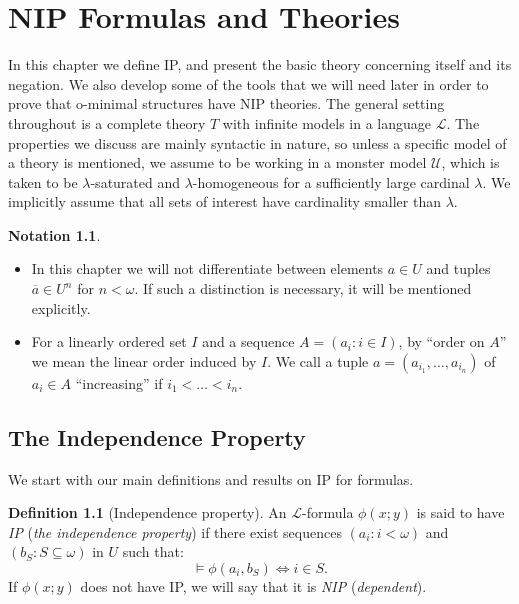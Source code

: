 \documentclass[a4paper]{report}
\newcommand{\ind}{\hspace{15pt}}
\renewcommand{\L}{\mathcal{L}}
\newcommand{\U}{\mathcal{U}}
\renewcommand{\a}{\overline{a}}
\renewcommand{\iff}{\Leftrightarrow}
\theoremstyle{definition}
\newtheorem{defn}[thm]{Definition}
\theoremstyle{remstyle}
\newtheorem*{notation}{Notation}
\begin{document}
\chapter{NIP Formulas and Theories}

\ind In this chapter we define IP, and present the basic theory concerning itself and its negation. We also develop some of the tools that we will need later in order to prove that o-minimal structures have NIP theories. The general setting throughout is a complete theory $T$ with infinite models in a language $\L$. The properties we discuss are mainly syntactic in nature, so unless a specific model of a theory is mentioned, we assume to be working in a monster model $\U$, which is taken to be  $\lambda$-saturated and $\lambda$-homogeneous for a sufficiently large cardinal $\lambda$. We implicitly assume that all sets of interest have cardinality smaller than $\lambda$.

\begin{notation}\
	\begin{itemize}
		\item In this chapter we will not differentiate between elements $a\in U$ and tuples $\a\in U^n$ for $n<\omega$. If such a distinction is necessary, it will be mentioned explicitly.

		\item For a linearly ordered set $I$ and a sequence $A=(a_i:i\in I)$, by ``order on $A$'' we mean the linear order induced by $I$. We call a tuple $a=(a_{i_1},\ldots,a_{i_n})$ of $a_i\in A$ ``increasing'' if $i_1<\ldots<i_n$.
	\end{itemize}
\end{notation}

\section{The Independence Property}

\ind We start with our main definitions and results on IP for formulas.

\begin{defn}[Independence property]\label{ip}
	An $\L$-formula $\phi(x;y)$ is said to have \emph{IP} (\emph{the independence property}) if there exist sequences $(a_i:i<\omega)$ and $(b_S: S\subseteq \omega)$ in $U$ such that:
	\begin{equation*}
		\models \phi(a_i,b_S) \iff i\in S.
	\end{equation*}
	If $\phi(x;y)$ does not have IP, we will say that it is \emph{NIP} (\emph{dependent}).
\end{defn}
\end{document}
